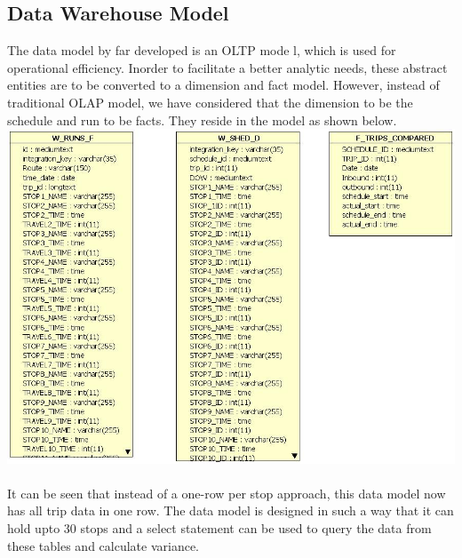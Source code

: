 \documentclass[12pt]{article}\usepackage[]{graphicx}\usepackage[]{color}
\begin{document}
\subsection{Data Warehouse Model}
The data model by far developed is an OLTP mode	l, which is used for operational efficiency. Inorder to facilitate a better analytic needs, these abstract entities are to be converted to a dimension and fact model. However, instead of traditional OLAP model, we have considered that the dimension to be the schedule and run to be facts. They reside in the model as shown below.\\
\includegraphics[scale=0.5]{resources/wh}\\[1cm] \\
It can be seen that instead of a one-row per stop approach, this data model now has all trip data in one row. The data model is designed in such a way that it can hold upto 30 stops and a select statement can be used to query the data from these tables and calculate variance.
\end{document}
